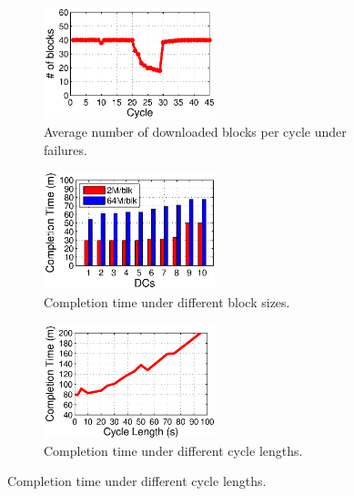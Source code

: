 \begin{figure}[t]
        \centering
        \begin{subfigure}[b]{0.3\textwidth}
                \centering
                \includegraphics[width=50mm]{images/failure_v2.eps}%
                \caption{Average number of downloaded blocks per cycle under failures.}
                \label{fig:analysis:failure}
        \end{subfigure}
        \begin{subfigure}[b]{0.3\textwidth}
                \centering
                \includegraphics[width=50mm]{images/blkSize_v2.eps} %
                \caption{Completion time under different block sizes.}
                \label{fig:analysis:blksize}
        \end{subfigure}
        \begin{subfigure}[b]{0.3\textwidth}
                \centering
                \includegraphics[width=50mm]{images/cycleDiff.eps}%
                \caption{Completion time under different cycle lengths.}
                \label{fig:analysis:cycleDiff}
        \end{subfigure}
        \label{fig:analysis}
\vspace{-0.4cm}
\end{figure}


